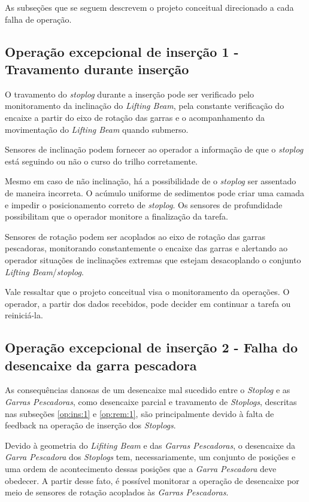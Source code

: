 As subseções que se seguem descrevem o projeto conceitual direcionado a cada
falha de operação.

\subsection{Operação excepcional de inserção 1 - Travamento durante inserção} O
travamento do \emph{stoplog} durante a inserção pode ser verificado pelo
monitoramento da inclinação do \emph{Lifting Beam}, pela constante verificação
do encaixe a partir do eixo de rotação das garras e o acompanhamento da
movimentação do \emph{Lifting Beam} quando submerso.

Sensores de inclinação podem fornecer ao operador a informação de que o
\emph{stoplog} está seguindo ou não o curso do trilho corretamente.

Mesmo em caso de não inclinação, há a possibilidade de o \emph{stoplog} ser
assentado de maneira incorreta. O acúmulo uniforme de sedimentos pode criar uma
camada e impedir o posicionamento correto de \emph{stoplog}. Os sensores de
profundidade possibilitam que o operador monitore a finalização da tarefa.

Sensores de rotação podem ser acoplados ao eixo de rotação das garras
pescadoras, monitorando constantemente o encaixe das garras e alertando ao
operador situações de inclinações extremas que estejam desacoplando o conjunto
\emph{Lifting Beam}/\emph{stoplog}.

Vale ressaltar que o projeto conceitual visa o monitoramento da operações. O
operador, a partir dos dados recebidos, pode decider em continuar a tarefa ou
reiniciá-la.

\subsection{Operação excepcional de inserção 2 - Falha do desencaixe da garra pescadora}
\label{op:sol:ins:1}

As consequências danosas de um desencaixe mal sucedido entre o \emph{Stoplog} e
as \emph{Garras Pescadoras}, como desencaixe parcial e travamento de
\emph{Stoplogs}, descritas nas subseções \ref{op:ins:1} e \ref{op:rem:1}, são
principalmente devido à falta de feedback na operação de inserção dos
\emph{Stoplogs}.

Devido à geometria do \emph{Lifiting Beam} e das \emph{Garras Pescadoras}, o
desencaixe da \emph{Garra Pescadora} dos \emph{Stoplogs} tem, necessariamente,
um conjunto de posições e uma ordem de acontecimento dessas posições que a
\emph{Garra Pescadora} deve obedecer. A partir desse fato, é possível monitorar
a operação de desencaixe por meio de sensores de rotação acoplados às
\emph{Garras Pescadoras}.

